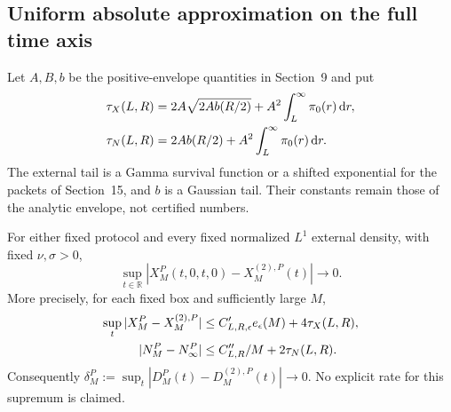 \subsection{Uniform absolute approximation on the full time axis}
Let $A,B,b$ be the positive-envelope quantities in Section~9 and put
\begin{align}
 \tau_X(L,R)&=2A\sqrt{2A b(R/2)}
                  +A^2\int_L^\infty\pi_0(r)\mathop{}\!\mathrm d r,\notag\\
 \tau_N(L,R)&=2A b(R/2)+A^2\int_L^\infty\pi_0(r)\mathop{}\!\mathrm d r.
 \label{eq:tb-tails}
\end{align}
The external tail is a Gamma survival function or a shifted exponential
for the packets of Section~15, and $b$ is a Gaussian tail. Their
constants remain those of the analytic envelope, not certified numbers.
\begin{theorem}
For either fixed protocol and every fixed normalized $L^1$ external
density, with fixed $\nu,\sigma>0$,
\begin{equation}
 \sup_{t\in\mathbb R}|X^P_M(t,0,t,0)-X^{(2),P}_M(t)|\longrightarrow0.
 \label{eq:tb-uniform-X}
\end{equation}
More precisely, for each fixed box and sufficiently large $M$,
\begin{align}
 \sup_t|X^P_M-X^{(2),P}_M|
 &\le C_{L,R,\epsilon}'e_\epsilon(M)+4\tau_X(L,R),\notag\\
 |N^P_M-N^P_\infty|
 &\le C''_{L,R}/M+2\tau_N(L,R).
 \label{eq:tb-cutoff-bound}
\end{align}
Consequently $\delta_M^P:=\sup_t|D^P_M(t)-D^{(2),P}_M(t)|\to0$.
No explicit rate for this supremum is claimed.
\label{thm:tb-uniform}
\end{theorem}
